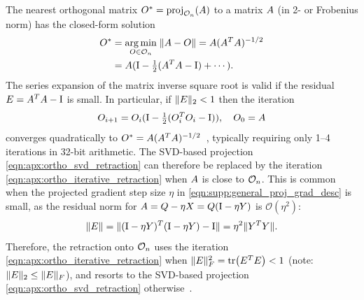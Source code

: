 The nearest orthogonal matrix $\vv{O}^* = \Proj{\Ortho{n}}{\vv{A}}$ to a matrix $A$ (in 2- or Frobenius norm) has the closed-form solution~\citep{higham_matrix_1988}
\begin{align}
    O^* & = \underset{O \in \mathcal{O}_{n}}{\operatorname{arg\,min}} \; \lVert A - O \rVert = A ( A^T A )^{-1/2} \\
             & = A ( \mathrm{I} - \tfrac{1}{2} (A^T A - \mathrm{I}) + \cdots ).
\end{align}
The series expansion of the matrix inverse square root is valid if the residual $E = A^T A - \mathrm{I}$ is small.
In particular, if $\lVert E \rVert_2 < 1$ then the iteration
\begin{align}\label{eqn:apx:ortho_iterative_retraction}
    O_{i+1} = O_{i} ( \mathrm{I} - \tfrac{1}{2} (O_{i}^T O_{i} - \mathrm{I}) ), \quad O_{0} = A
\end{align}
converges quadratically to $O^* = A ( A^T A )^{-1/2}$~\citep{higham_matrix_1988}, typically requiring only 1--4 iterations in 32-bit arithmetic.
The \gls*{SVD}-based projection \eqref{eqn:apx:ortho_svd_retraction} can therefore be replaced by the iteration \eqref{eqn:apx:ortho_iterative_retraction} when $A$ is close to $\mathcal{O}_{n}$.
This is common when the projected gradient step size $\eta$ in \eqref{eqn:supp:general_proj_grad_desc} is small, as the residual norm for $A = Q - \eta X = Q (\mathrm{I} - \eta Y)$ is $\mathcal{O}(\eta^2)$:
\begin{align*}
    \lVert E \rVert = \lVert (\mathrm{I} - \eta Y)^T (\mathrm{I} - \eta Y) - \mathrm{I} \rVert = \eta^2 \lVert Y^T Y \rVert.
\end{align*}
Therefore, the retraction onto $\mathcal{O}_{n}$ uses the iteration \eqref{eqn:apx:ortho_iterative_retraction} when $\lVert \vv{E} \rVert_F^2 = \Tr{\vv{E}^T \vv{E}} < 1$ (note: $\lVert E \rVert_2 \le \lVert E \rVert_F$), and resorts to the \gls*{SVD}-based projection \eqref{eqn:apx:ortho_svd_retraction} otherwise~\citep{higham_functions_2008}.

